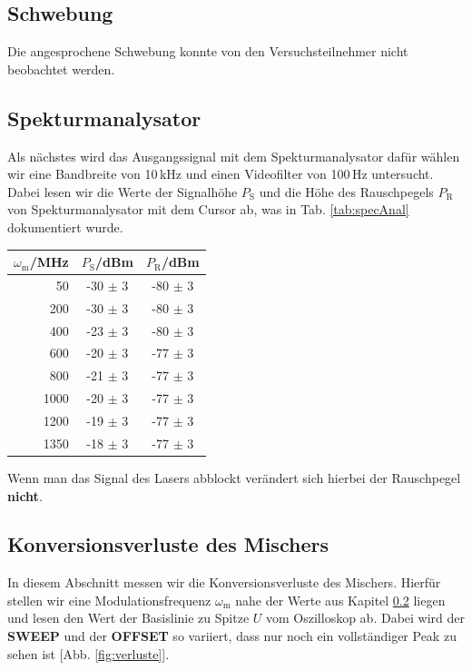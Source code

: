 \subsection{Schwebung}
\label{sub:schewbung}

Die angesprochene Schwebung konnte von den Versuchsteilnehmer nicht beobachtet werden.

\subsection{Spekturmanalysator}
\label{sub:specAnal}

Als nächstes wird das Ausgangssignal mit dem Spekturmanalysator dafür wählen wir eine Bandbreite von 10\,kHz und einen Videofilter von 100\,Hz untersucht. Dabei lesen wir die Werte der Signalhöhe $P_\mathrm{S}$ und die Höhe des Rauschpegels $P_\mathrm{R}$ von Spekturmanalysator mit dem Cursor ab, was in Tab. \ref{tab:specAnal} dokumentiert wurde.
\begin{center}
    \captionsetup{type=table}
    \begin{tabular}{r | c c}
        $\omega_\mathrm{m}$/MHz & $P_\mathrm{S}$/dBm & $P_\mathrm{R}$/dBm \\ \hline
        50   & -30 $\pm$ 3 & -80 $\pm$ 3 \\
        200  & -30 $\pm$ 3 & -80 $\pm$ 3 \\
        400  & -23 $\pm$ 3 & -80 $\pm$ 3 \\
        600  & -20 $\pm$ 3 & -77 $\pm$ 3 \\
        800  & -21 $\pm$ 3 & -77 $\pm$ 3 \\
        1000 & -20 $\pm$ 3 & -77 $\pm$ 3 \\
        1200 & -19 $\pm$ 3 & -77 $\pm$ 3 \\
        1350 & -18 $\pm$ 3 & -77 $\pm$ 3 \\
    \end{tabular}
    \label{tab:specAnal}
\end{center}
Wenn man das Signal des Lasers abblockt verändert sich hierbei der Rauschpegel \textbf{nicht}.

\subsection{Konversionsverluste des Mischers}
\label{sub:verluste}

In diesem Abschnitt messen wir die Konversionsverluste des Mischers. Hierfür stellen wir eine Modulationsfrequenz $\omega_\mathrm{m}$ nahe der Werte aus Kapitel \ref{sub:specAnal} liegen und lesen den Wert der Basislinie zu Spitze $U$ vom Oszilloskop ab. Dabei wird der \textbf{SWEEP} und der \textbf{OFFSET} so variiert, dass nur noch ein vollständiger Peak zu sehen ist [Abb. \ref{fig:verluste}].

